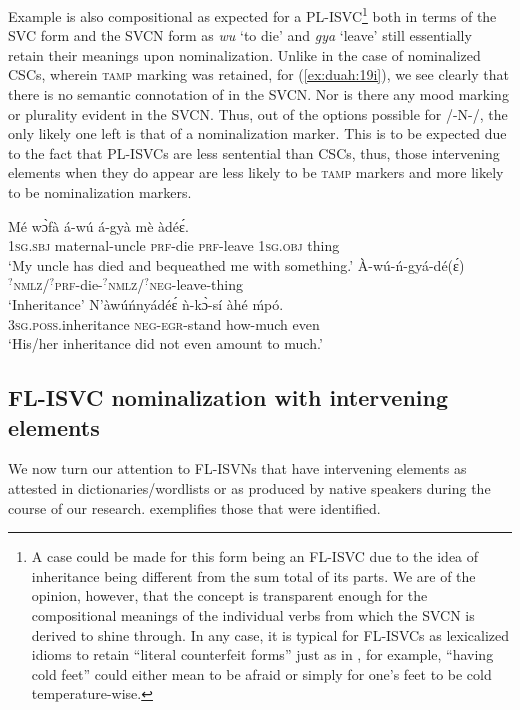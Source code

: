 \documentclass[output=paper,modfonts,nonflat,
colorlinks, citecolor=brown,
]{langsci/langscibook}
\begin{document}
\clearpage
Example  is also compositional as expected for a PL-ISVC\footnote{A case could be made for this form being an FL-ISVC due to the idea of inheritance being different from the sum total of its parts. We are of the opinion, however, that the concept is transparent enough for the compositional meanings of the individual verbs from which the SVCN is derived to shine through. In any case, it is typical for FL-ISVCs as lexicalized idioms to retain “literal counterfeit forms” just as in , for example, “having cold feet” could either mean to be afraid or simply for one’s feet to be cold temperature-wise.} both in terms of the SVC form and the SVCN form as \textit{wu} ‘to die’ and \textit{gya} ‘leave’ still essentially retain their meanings upon nominalization. Unlike in the case of nominalized CSCs, wherein \textsc{tamp} marking was retained, for (\ref{ex:duah:19i}), we see clearly that there is no semantic connotation of  in the SVCN. Nor is there any mood marking or plurality evident in the SVCN. Thus, out of the options possible for /-N-/, the only likely one left is that of a nominalization marker. This is to be expected due to the fact that PL-ISVCs are less sentential than CSCs, thus, those intervening elements when they do appear are less likely to be \textsc{tamp} markers and more likely to be nominalization markers.

\ea\label{ex:duah:19i}
\ea\label{ex:duah:19ia}
\gll Mé wɔ̀fà á-wú á-gyà mè àdéɛ́.\\
1\textsc{sg}.\textsc{sbj}	maternal-uncle \textsc{\textsc{prf}}-die	\textsc{\textsc{prf}}-leave 1\textsc{sg}.\textsc{obj} thing\\
\glt `My uncle has died and bequeathed me with something.'
\ex\label{ex:duah:19ib}
\gll À-wú-ń-gyá-dé(ɛ́)\\
$^{\text{?}}$\textsc{nmlz}/$^{\text{?}}$\textsc{prf}-die-$^{\text{?}}$\textsc{nmlz}/$^{\text{?}}$\textsc{neg}-leave-thing\\
\glt `Inheritance'
\ex\label{ex:duah:19ic}
\gll N’àwúńnyádéɛ́ ǹ-kɔ̀-sí àhé ḿpó.\\
3\textsc{sg}.\textsc{poss}.inheritance \textsc{neg}-\textsc{egr}-stand how-much	even\\
\glt `His/her inheritance did not even amount to much.'
\z
\z


\subsection{FL-ISVC nominalization with intervening elements}
We now turn our attention to FL-ISVNs that have intervening elements as attested in dictionaries/wordlists or as produced by native speakers during the course of our research.  exemplifies those that were identified.
\end{document}
